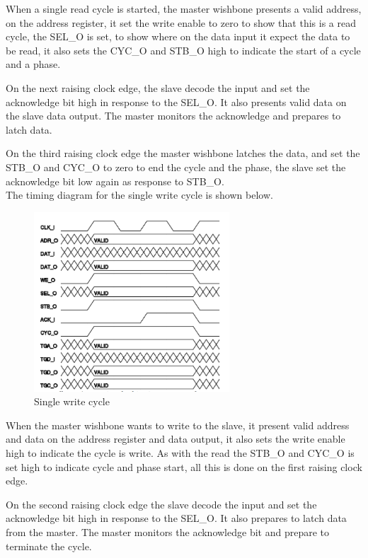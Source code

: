 When a single read cycle is started, the master wishbone presents a valid address, on the address register, it set the write enable to zero to show that this is a read cycle, the SEL\_O is set, to show where on the data input it expect the data to be read, it also sets the CYC\_O and STB\_O high to indicate the start of a cycle and a phase.


On the next raising clock edge, the slave decode the input and set the acknowledge bit high in response to the SEL\_O. It also presents valid data on the slave data output. The master monitors the acknowledge and prepares to latch data.


On the third raising clock edge the master wishbone latches the data, and set the STB\_O and CYC\_O to zero to end the cycle and the phase, the slave set the acknowledge bit low again as response to STB\_O.\\
The timing diagram for the single write cycle is shown below.
\begin{figure}[H]
	\begin{centering}
		 \includegraphics[width=0.65\textwidth]{images/wb_single_write.png}
		\caption{Single write cycle}
	\end{centering}
\end{figure}
When the master wishbone wants to write to the slave, it present valid address and data on the address register and data output, it also sets the write enable high to indicate the cycle is write. As with the read the STB\_O and CYC\_O is set high to indicate cycle and phase start, all this is done on the first raising clock edge.

On the second raising clock edge the slave decode the input and set the acknowledge bit high in response to the SEL\_O. It also prepares to latch data from the master. The master monitors the acknowledge bit and prepare to terminate the cycle.

